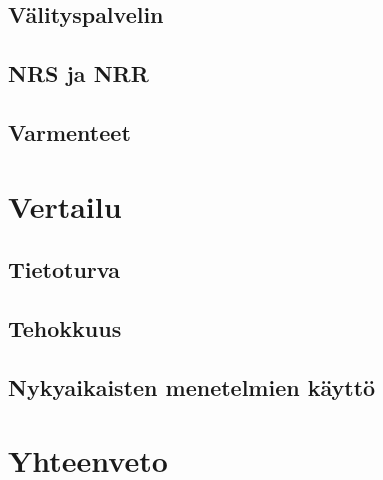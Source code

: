 \documentclass[finnish]{tktltiki2}
\theoremstyle{definition}
\theoremstyle{remark}
\begin{document}
\subsection{Välityspalvelin}
\subsection{NRS ja NRR}
\subsection{Varmenteet}

\section{Vertailu}
\subsection{Tietoturva}
\subsection{Tehokkuus}
\subsection{Nykyaikaisten menetelmien käyttö}

\section{Yhteenveto}  



%
%
%

\newpage






 
\end{document}

